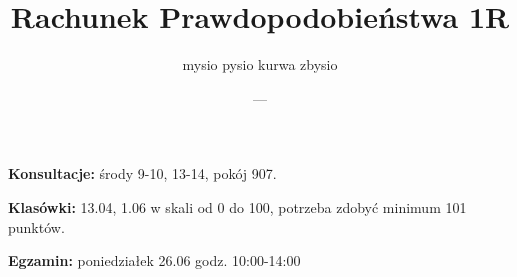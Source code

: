 \documentclass{article}
\title{Rachunek Prawdopodobieństwa 1R}
\author{mysio pysio kurwa zbysio}
\date{---}
\begin{document}
\maketit

\textbf{\color{orange}Konsultacje:} środy 9-10, 13-14, pokój 907.

\textbf{\color{orange}Klasówki:} 13.04, 1.06 w skali od 0 do 100, potrzeba zdobyć minimum 101 punktów.

\textbf{\color{orange}Egzamin:} poniedziałek 26.06 godz. 10:00-14:00
\tableofcontents
\newpage


\newpage


\newpage


\newpage


\end{document}
